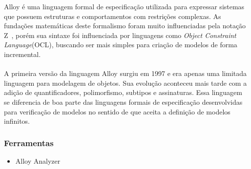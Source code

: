 Alloy é uma linguagem formal de especificação utilizada para expressar sistemas que possuem
estruturas e comportamentos com restrições complexas. As fundações matemáticas deste formalismo
foram muito influenciadas pela notação Z~\cite{opac-b1091336}, porém sua sintaxe foi influenciada
por linguagens como \textit{Object Constraint Language}(OCL), buscando ser mais simples para
criação de modelos de forma incremental.
\paragraph{}
A primeira versão da linguagem Alloy surgiu em 1997 e era apenas uma limitada linguagem para modelagem
de objetos. Sua evolução aconteceu mais tarde com a adição de quantificadores, polimorfismo, subtipos e
assinaturas. Essa linguagem se diferencia de boa parte das linguagens formais de especificação desenvolvidas
para verificação de modelos no sentido de que aceita a definição de modelos infinitos.

\subsubsection{Ferramentas}
\begin{itemize}
\item{Alloy Analyzer}
\end{itemize}
